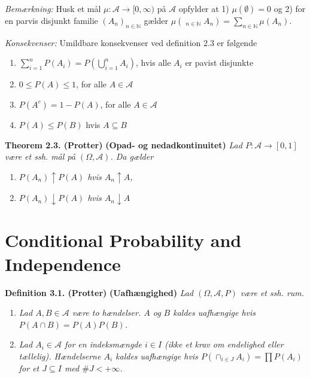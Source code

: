 \documentclass[a4paper,10pt,openany]{book}
\providecommand{\tightlist}{%
 \setlength{\itemsep}{0pt}\setlength{\parskip}{0pt}}
\begin{document}
\emph{Bemærkning:} Husk et mål \(\mu : \mathcal{A}\to [0,\infty)\) på \(\mathcal{A}\) opfylder at 1) \(\mu(\emptyset)=0\) og 2) for en parvis disjunkt familie \((A_n)_{n\in\mathbb{N}}\) gælder \(\mu\left(\mathop{\dot{\bigcup}}_{n\in\mathbb{N}}A_n\right)=\sum_{n\in\mathbb{N}}\mu(A_n)\).

\emph{Konsekvenser:} Umildbare konsekvenser ved definition 2.3 er følgende

\begin{enumerate}
\def\labelenumi{\roman{enumi}.}
\tightlist
\item
  \(\sum_{i=1}^n P(A_i)=P\left(\bigcup_{i=1}^nA_i\right)\), hvis alle \(A_i\) er pavist disjunkte
\item
  \(0\le P(A)\le 1\), for alle \(A\in\mathcal{A}\)
\item
  \(P(A^c)=1-P(A)\), for alle \(A\in\mathcal{A}\)
\item
  \(P(A)\le P(B)\) hvis \(A\subseteq B\)
\end{enumerate}

\textbf{Theorem 2.3. (Protter)} \textbf{(Opad- og nedadkontinuitet)} \emph{Lad \(P : \mathcal{A}\to[0,1]\) være et ssh. mål på \((\Omega,\mathcal{A})\). Da gælder}

\begin{enumerate}
\def\labelenumi{\roman{enumi}.}
\setcounter{enumi}{2}
\tightlist
\item
  \emph{\(P(A_n)\uparrow P(A)\) hvis \(A_n\uparrow A\),}
\item
  \emph{\(P(A_n)\downarrow P(A)\) hvis \(A_n\downarrow A\)}
\end{enumerate}

\hypertarget{conditional-probability-and-independence}{%
\section{Conditional Probability and Independence}\label{conditional-probability-and-independence}}

\textbf{Definition 3.1. (Protter)} \textbf{(Uafhængighed)} \emph{Lad \((\Omega,\mathcal{A},P)\) være et ssh. rum.}

\begin{enumerate}
\def\labelenumi{\alph{enumi}.}
\tightlist
\item
  \emph{Lad \(A,B\in\mathcal{A}\) være to hændelser. \(A\) og \(B\) kaldes uafhængige hvis \(P(A\cap B)=P(A)P(B)\).}
\item
  \emph{Lad \(A_i\in\mathcal{A}\) for en indeksmængde \(i\in I\) (ikke et krav om endelighed eller tællelig). Hændelserne \(A_i\) kaldes uafhængige hvis \(P(\cap_{i\in J}A_i)=\prod P(A_i)\) for et \(J\subseteq I\) med \(\# J< +\infty\).}
\end{enumerate}
\end{document}
